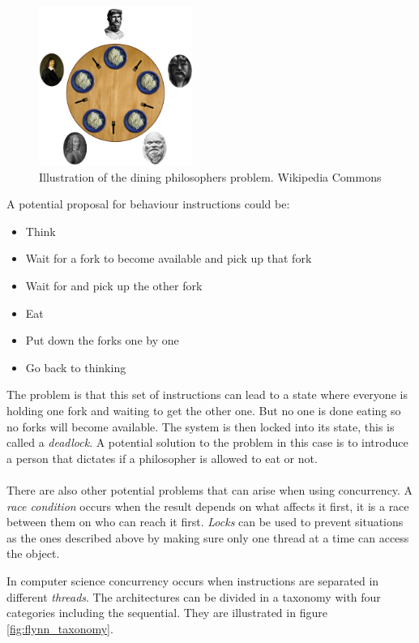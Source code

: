 \documentclass[10pt,a4paper]{report}
\begin{document}
\begin{figure}[h]
    \centering
    \includegraphics[width=5cm]{dining_philosophers.png}
    \caption{Illustration of the dining philosophers problem. Wikipedia Commons}
    \label{fig:dining_philosophers}
\end{figure}

A potential proposal\cite{hoare1985communicating} for behaviour instructions could be:
\begin{itemize}
 \item Think
 \item Wait for a fork to become available and pick up that fork
 \item Wait for and pick up the other fork
 \item Eat
 \item Put down the forks one by one
 \item Go back to thinking
\end{itemize}
The problem is that this set of instructions can lead to a state where everyone is holding one fork and waiting to get the other one\cite{hoare1985communicating}. But no one is done eating so no forks will become available. The system is then locked into its state, this is called a \emph{deadlock}\cite{hoare1985communicating, introduction_hpc_hager}. A potential solution to the problem in this case is to introduce a person that dictates if a philosopher is allowed to eat or not\cite{hoare1985communicating}.\\
\\
There are also other potential problems that can arise when using concurrency. A \emph{race condition} occurs when the result depends on what affects it first, it is a race between them on who can reach it first\cite{introduction_hpc_hager}. \emph{Locks} can be used to prevent situations as the ones described above by making sure only one thread at a time can access the object\cite{introduction_hpc_hager}.

In computer science concurrency occurs when instructions are separated in different \emph{threads}. The architectures can be divided in a taxonomy with four categories including the sequential. They are illustrated in figure \ref{fig:flynn_taxonomy}.
\end{document}
